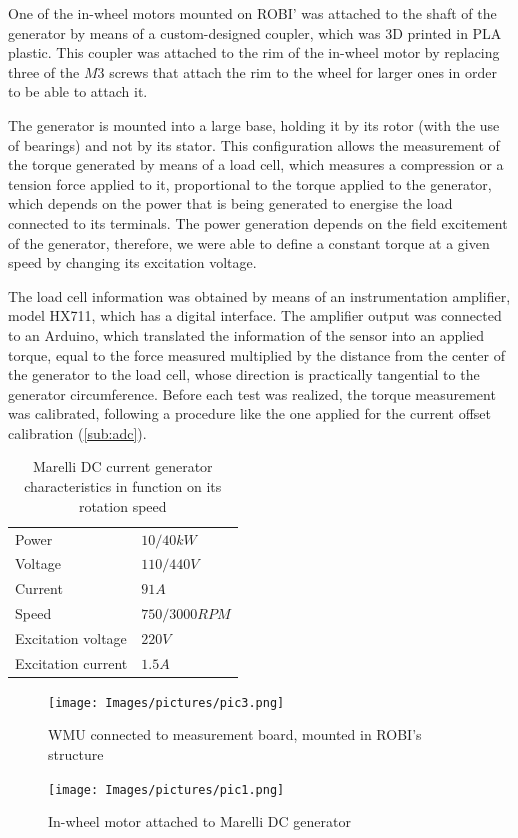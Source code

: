 One of the in-wheel motors mounted on ROBI' was attached to the shaft of the generator by means of a custom-designed coupler, which was 3D printed in PLA plastic. This coupler was attached to the rim of the in-wheel motor by replacing three of the $M3$ screws that attach the rim to the wheel for larger ones in order to be able to attach it.

The generator is mounted into a large base, holding it by its rotor (with the use of bearings) and not by its stator. This configuration allows the measurement of the torque generated by means of a load cell, which measures a compression or a tension force applied to it, proportional to the torque applied to the generator, which depends on the power that is being generated to energise the load connected to its terminals. The power generation depends on the field excitement of the generator, therefore, we were able to define a constant torque at a given speed by changing its excitation voltage.

The load cell information was obtained by means of an instrumentation amplifier, model HX711, which has a digital interface. The amplifier output was connected to an Arduino, which translated the information of the sensor into an applied torque, equal to the force measured multiplied by the distance from the center of the generator to the load cell, whose direction is practically tangential to the generator circumference. Before each test was realized, the torque measurement was calibrated, following a procedure like the one applied for the current offset calibration (\ref{sub:adc}).

\begin{table}[]
\centering
\caption{Marelli DC current generator characteristics in function on its rotation speed}
\label{table:marelli}
\begin{tabular}{@{}ll@{}}
\toprule
Power 					& $10/40 kW$ \\
Voltage 				& $110/440 V$ \\
Current 				& $91 A$ \\
Speed   				& $750/3000 RPM$ \\
Excitation voltage     	& $220 V$ \\
Excitation current      & $1.5 A$ \\ 
\bottomrule
\end{tabular}
\end{table}

\begin{figure}[htbp]
\centering
\texttt{[image: Images/pictures/pic3.png]} 
\caption[WMU connected to measurement board]{WMU connected to measurement board, mounted in ROBI's structure}
\label{fig:foc_flow}
\end{figure}

\begin{figure}
    \texttt{[image: Images/pictures/pic1.png]} 
    \caption[In-wheel motor attached to Marelli DC generator]{In-wheel motor attached to Marelli DC generator}
    \label{fig:pic1}
\end{figure}